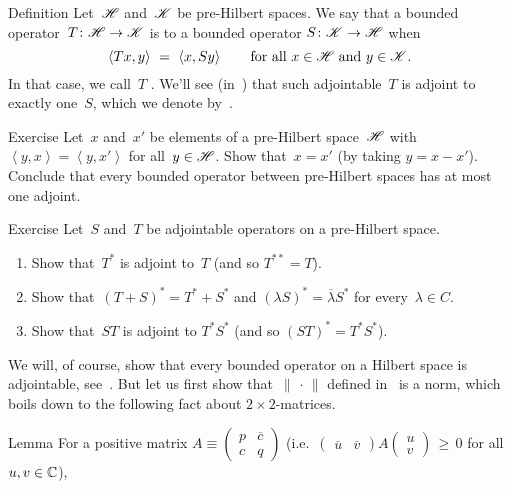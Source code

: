 \documentclass[main]{subfiles}
\begin{document}
\begin{parsec}[hilb]
\begin{point}{Definition}
Let~$\mathscr{H}$ and~$\mathscr{K}$ be pre-Hilbert spaces.
We say that a bounded operator~$T\colon \mathscr{H}\to \mathscr{K}$
is 
to a bounded operator
$S\colon \mathscr{K}\to \mathscr{H}$ 
when
\begin{equation*}
\left<Tx,y\right> \ = \ \left<x,Sy\right>
\qquad\text{for all $x\in \scrH$ and $y\in \scrK$.}
\end{equation*}
In that case, we call~$T$ .
We'll see (in~)
that such adjointable~$T$ is adjoint to exactly one~$S$,
which we denote by~.
\end{point}
\begin{point}{Exercise}%
Let~$x$ and~$x'$ be elements of a pre-Hilbert space~$\mathscr{H}$
with $\left<y,x\right>=\left<y,x'\right>$
for all~$y\in\mathscr{H}$.
Show that~$x=x'$ (by taking $y=x-x'$).
Conclude that every bounded operator between pre-Hilbert spaces
has at most one adjoint.
\end{point}
\begin{point}{Exercise}%
Let~$S$ and~$T$ be adjointable operators on a pre-Hilbert space.
\begin{enumerate}
\item
Show that~$T^*$ is adjoint to~$T$ (and so $T^{**}=T$).
\item
Show that~$(T+S)^*=T^*+S^*$
and $(\lambda S)^*=\overline{\lambda}S^*$
for every~$\lambda\in C$.
\item
Show that~$ST$ is adjoint to $T^*S^*$ (and so $(ST)^*=T^*S^*$).
\end{enumerate}
We will, of course, show
that every bounded operator on a Hilbert space is adjointable,
see~.
But let us first show that~$\|\,\cdot\,\|$
defined in~ is a norm,
which boils down to the following fact
about  $2\times 2$-matrices.
\end{point}
\begin{point}{Lemma}%
For a positive matrix $A\equiv 
\left(\begin{smallmatrix}p & \overline{c} \\ c & q\end{smallmatrix}\right)$
(i.e.~$\left(
\begin{smallmatrix}\overline{u}&\overline{v}\end{smallmatrix}\right)
A
\left(\begin{smallmatrix}u \\ v \end{smallmatrix}\right) \,\geq \, 0$
for all~$u,v\in \mathbb{C}$),

\end{point}
\end{parsec}
\end{document}

